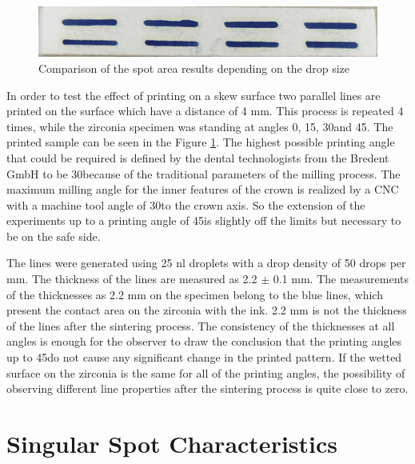 	\bigskip

	\begin{figure}[H]
		\centering
		\includegraphics[width=1\textwidth]{grafiken/angleprint.jpg}
		\caption{Comparison of the spot area results depending on the drop size}
		\label{fig:angleprint}
	\end{figure} 

	\bigskip

In order to test the effect of printing on a skew surface two parallel lines are printed on the surface which have a distance of 4 mm. This process is repeated 4 times, while the zirconia specimen was standing at angles 0\textdegree \space, 15\textdegree \space, 30\textdegree \space and 45\textdegree \space. The printed sample can be seen in the Figure \ref{fig:angleprint}. The highest possible printing angle that could be required is defined by the dental technologists from the Bredent GmbH to be 30\textdegree \space because of the traditional parameters of the milling process. The maximum milling angle for the inner features of the crown is realized by a CNC with a machine tool angle of 30\textdegree \space to the crown axis. So the extension of the experiments up to a printing angle of 45\textdegree \space is slightly off the limits but necessary to be on the safe side.

The lines were generated using 25 nl droplets with a drop density of 50 drops per mm. The thickness of the lines are measured as 2.2 $\pm$ 0.1 mm. The measurements of the thicknesses as 2.2 mm on the specimen belong to the blue lines, which present the contact area on the zirconia with the ink. 2.2 mm is not the thickness of the lines after the sintering process. The consistency of the thicknesses at all angles is enough for the observer to draw the conclusion that the printing angles up to 45\textdegree \space do not cause any significant change in the printed pattern. If the wetted surface on the zirconia is the same for all of the printing angles, the possibility of observing different line properties after the sintering process is quite close to zero.

\section{Singular Spot Characteristics}

